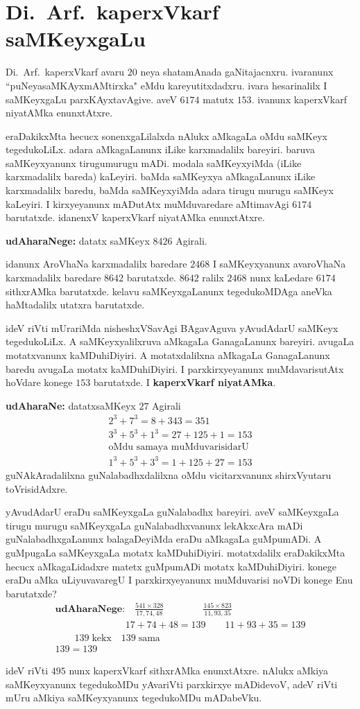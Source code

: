 \chapter{Di.~Arf.~kaperxVkarf saMKeyxgaLu}

Di.~Arf.\ kaperxVkarf avaru $20$ neya shatamAnada gaNitajacnxru. ivaranunx ``puNeya\break saMKAyxmAMtirxka" eMdu kareyutitxdadxru. ivara hesarinalilx I saMKeyxgaLu parxKAyxta\-vAgive. aveV $6174$ matutx $153$. ivanunx kaperxVkarf niyatAMka enunxtAtxre.

eraDakikxMta hecucx sonenxgaLilalxda nAlukx aMkagaLa oMdu saMKeyx tegedukoLiLx. adara aMkagaLanunx iLike karxmadalilx bareyiri. baruva saMKeyxyanunx tirugumurugu mADi. modala saMKeyxyiMda (iLike karxmadalilx bareda) kaLeyiri. baMda saMKeyxya aMkagaLanunx iLike karxmadalilx baredu, baMda saMKeyxyiMda adara tirugu murugu saMKeyx kaLeyiri. I kirxyeyanunx mADutAtx muMduvaredare aMtimavAgi $6174$ barutatxde. idanenxV kaperxVkarf niyatAMka enunxtAtxre.

\textbf{udAharaNege:}\; datatx saMKeyx $8426$ Agirali.

idanunx AroVhaNa karxmadalilx baredare $2468$ I saMKeyxyanunx avaroVhaNa karxmadalilx baredare $8642$ barutatxde. $8642$ ralilx $2468$ nunx kaLedare $6174$ sithxrAMka barutatxde. kelavu saMKeyxgaLanunx tegedukoMDAga aneVka haMtadalilx utatxra barutatxde.

ideV riVti mUrariMda nisheshxVSavAgi BAgavAguva yAvudAdarU saMKeyx tegedu\-koLiLx. A saMKeyxyalilxruva aMkagaLa GanagaLanunx bareyiri. avugaLa motatxvanunx kaMDu\-hiDiyiri. A motatxdalilxna aMkagaLa GanagaLanunx baredu avugaLa motatx kaMDu\-hiDiyiri. I parxkirxyeyanunx muMdavarisutAtx hoVdare konege $153$ barutatxde. I\textbf{ kaperxVkarf niyatAMka}. 

\textbf{udAharaNe:}\; datatxsaMKeyx $27$ Agirali
\begin{gather*}
2^3+7^3 = 8+343 = 351\\
3^3+5^3+1^3 = 27+125+1 = 153\\
\text{oMdu samaya muMduvarisidarU}\\
1^3+5^3+3^3 = 1+125+27 = 153
\end{gather*}
guNAkAradalilxna guNalabadhxdalilxna oMdu vicitarxvanunx shirxVyutaru toVrisidAdxre.

yAvudAdarU eraDu saMKeyxgaLa guNalabadhx bareyiri. aveV saMKeyxgaLa tirugu murugu saMKeyxgaLa guNalabadhxvanunx lekAkxcAra mADi guNalabadhxgaLanunx balagaDeyiMda eraDu aMkagaLa guMpumADi. A guMpugaLa saMKeyxgaLa motatx kaMDuhiDiyiri. motatxdalilx eraDakikxMta hecucx aMkagaLidadxre matetx guMpumADi motatx kaMDuhiDiyiri. konege eraDu aMka uLiyuvavaregU I parxkirxyeyanunx muMduvarisi noVDi konege Enu barutatxde?
\begin{gather*}
\textbf{udAharaNege:}\quad \frac{541\times 328}{17,74,48} \qquad\qquad \frac{145 \times 823}{11,93,35}\\
\phantom{\text{udAharaNege:}}\quad 17+74+48 = 139 \qquad 11+93+35 = 139\\
\qquad 139\;\text{kekx} \quad 139\; \text{sama}\\
139 = 139
\end{gather*}

ideV riVti $495$ nunx  kaperxVkarf sithxrAMka enunxtAtxre. nAlukx aMkiya saMKeyxyanunx tegedukoMDu yAvariVti parxkirxye mADidevoV, adeV riVti mUru aMkiya saMKeyxyanunx tegedukoMDu mADabeVku.
